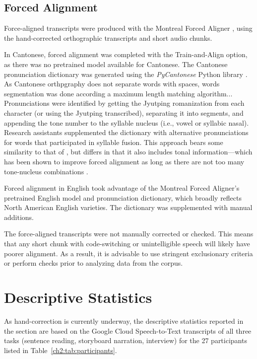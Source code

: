 \subsection{Forced Alignment}\label{ch2:subsec:alignment}
Force-aligned transcripts were produced with the Montreal Forced Aligner \citep{mcauliffe_2017_mfa}, using the hand-corrected orthographic transcripts and short audio chunks. 

In Cantonese, forced alignment was completed with the Train-and-Align option, as there was no pretrained model available for Cantonese. The Cantonese pronunciation dictionary was generated using the \textit{PyCantonese} Python library \citep{lee_2018_pycantonese}. As Cantonese orthpgraphy does not separate words with spaces, words segmentation was done according a maximum length matching algorithm... Pronunciations were identified by getting the Jyutping romanization from each character (or using the Jyutping transcribed), separating it into segments, and appending the tone number to the syllable nucleus (i.e., vowel or syllabic nasal). Research assistants supplemented the dictionary with alternative pronunciations for words that participated in syllable fusion. This approach bears some similarity to that of \citet{tse_2019_heritage}, but differs in that it also includes tonal information---which has been shown to improve forced alignment as long as there are not too many tone-nucleus combinations \citep{cavar_2016_endangered, yuan_2014_automatic}. %

Forced alignment in English took advantage of the Montreal Forced Aligner's pretrained English model and pronunciation dictionary, which broadly reflects North American English varieties. The dictionary was supplemented with manual additions. 

The force-aligned transcripts were not manually corrected or checked. This means that any short chunk with code-switching or unintelligible speech will likely have poorer alignment. As a result, it is advisable to use stringent exclusionary criteria or perform checks prior to analyzing data from the corpus. 


\section{Descriptive Statistics}\label{ch2:sec:statistics}
As hand-correction is currently underway, the descriptive statistics reported in the section are based on the Google Cloud Speech-to-Text transcripts of all three tasks (sentence reading, storyboard narration, interview) for the 27 participants listed in Table~\ref{ch2:tab:participants}. 

